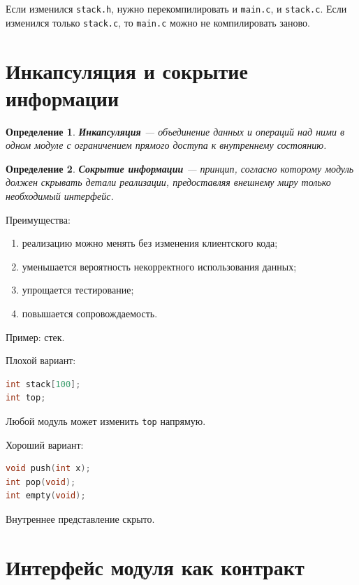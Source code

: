 \documentclass[12pt,a4paper]{article}
\newtheorem{definition}{Определение}
\begin{document}
Если изменился \texttt{stack.h}, нужно перекомпилировать и \texttt{main.c}, и \texttt{stack.c}. Если изменился только \texttt{stack.c}, то \texttt{main.c} можно не компилировать заново.

\section{Инкапсуляция и сокрытие информации}

\begin{definition}
\textbf{Инкапсуляция} --- объединение данных и операций над ними в одном модуле с ограничением прямого доступа к внутреннему состоянию.
\end{definition}

\begin{definition}
\textbf{Сокрытие информации} --- принцип, согласно которому модуль должен скрывать детали реализации, предоставляя внешнему миру только необходимый интерфейс.
\end{definition}

Преимущества:
\begin{enumerate}
  \item реализацию можно менять без изменения клиентского кода;
  \item уменьшается вероятность некорректного использования данных;
  \item упрощается тестирование;
  \item повышается сопровождаемость.
\end{enumerate}

Пример: стек.

Плохой вариант:

\begin{lstlisting}[language=C]
int stack[100];
int top;
\end{lstlisting}

Любой модуль может изменить \texttt{top} напрямую.

Хороший вариант:

\begin{lstlisting}[language=C]
void push(int x);
int pop(void);
int empty(void);
\end{lstlisting}

Внутреннее представление скрыто.

\section{Интерфейс модуля как контракт}
\end{document}
